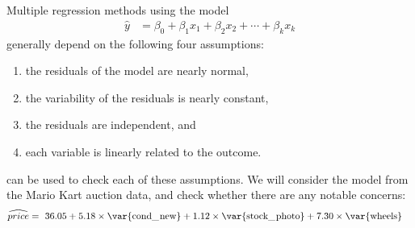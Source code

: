 Multiple regression methods using the model
\begin{align*}
\hat{y} &= \beta_0 + \beta_1x_1 + \beta_2x_2 + \cdots + \beta_kx_k
\end{align*}
generally depend on the following four assumptions:
\begin{enumerate}
\setlength{\itemsep}{0mm}
\item the residuals of the model are nearly normal,
\item the variability of the residuals is nearly constant,
\item the residuals are independent, and
\item each variable is linearly related to the outcome.
\end{enumerate}
 can be used to check each of these assumptions. We will consider the model from the Mario Kart auction data, and check whether there are any notable concerns:
\begin{align*}
\widehat{price} &= \ 36.05 + 5.18 \times \text{\var{cond\_\hspace{0.3mm}new}} + 1.12 \times \text{\var{stock\_\hspace{0.3mm}photo}} + 7.30 \times \text{\var{wheels}}
\end{align*}

